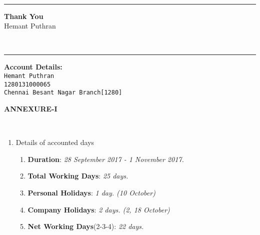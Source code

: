 \documentclass[]{invoice-style}
\begin{document}
\begin{minipage}[t][60em][c]{\textwidth}
\begin{minipage}[][][t]{\textwidth}
	\end{minipage}
		\vspace*{.25em}\\

\vfill
\hrule
	\begin{minipage}[][10em][b]{\textwidth}
	\begin{flushleft}
	{\large \bfseries Thank You}\vspace{.15cm}\\
	{\large  Hemant Puthran}
\end{flushleft}
	\end{minipage}\vspace*{1em}\\
\hrule
	\begin{minipage}[][7em][c]{\textwidth}
	\begin{flushleft}
{\large \bfseries Account Details:}\vspace{.15cm}\\
{\tt \large Hemant Puthran}\\
{\tt \large 1280131000065}\\
{\tt \large Chennai Besant Nagar Branch[1280]}\\


\end{flushleft}
	\end{minipage}

\end{minipage}
\newpage
	\begin{minipage}[][][c]{\textwidth}
		\begin{minipage}[][][c]{\textwidth}
	\begin{center}
	{\Large \textbf{ANNEXURE-\RN{1}}}
	\end{center}
	\end{minipage}
	\vspace{.35cm}\\

	\begin{minipage}[][][c]{\textwidth}
	\begin{enumerate}
		\item Details of accounted days
		\begin{enumerate}[topsep=0pt]\setlength{\itemsep}{0pt}
    \setlength{\parskip}{0pt}
    \setlength{\parsep}{0pt}
\item {\bfseries Duration}: {\itshape 28 September 2017 - 1 November 2017.}
\item {\bfseries Total Working Days}: {\itshape 25 days.}
\item {\bfseries Personal Holidays}: {\itshape 1 day. (10 October)}
\item {\bfseries Company Holidays}: {\itshape 2 days. (2, 18 October)}
\item {\bfseries Net Working Days}(2-3-4): {\itshape 22 days.}
\end{enumerate}
	\end{enumerate}
	\end{minipage}
	\end{minipage}
\end{document}
